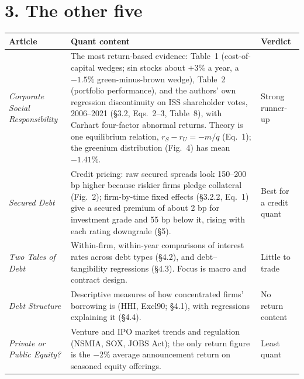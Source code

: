 \documentclass[11pt,a4paper]{article}
\begin{document}
\section*{3. The other five}
\begin{center}\small
\begin{tabularx}{\linewidth}{@{}lYl@{}}
  \toprule
  Article & Quant content & Verdict \\ \midrule
  \emph{Corporate Social Responsibility} &
  The most return-based evidence: Table~1 (cost-of-capital wedges; sin stocks about $+3\%$ a year, a
  $-1.5\%$ green-minus-brown wedge), Table~2 (portfolio performance), and the authors' own regression
  discontinuity on ISS shareholder votes, 2006--2021 (§3.2, Eqs.~2--3, Table~8), with Carhart
  four-factor abnormal returns. Theory is one equilibrium relation, $r_S-r_U=-m/q$ (Eq.~1); the greenium
  distribution (Fig.~4) has mean $-1.41\%$. &
  Strong runner-up \\[3pt]
  \emph{Secured Debt} &
  Credit pricing: raw secured spreads look 150--200 bp higher because riskier firms pledge collateral
  (Fig.~2); firm-by-time fixed effects (§3.2.2, Eq.~1) give a secured premium of about 2 bp for
  investment grade and 55 bp below it, rising with each rating downgrade (§5). &
  Best for a credit quant \\[3pt]
  \emph{Two Tales of Debt} &
  Within-firm, within-year comparisons of interest rates across debt types (§4.2), and debt--tangibility
  regressions (§4.3). Focus is macro and contract design. &
  Little to trade \\[3pt]
  \emph{Debt Structure} &
  Descriptive measures of how concentrated firms' borrowing is (HHI, Excl90; §4.1), with regressions
  explaining it (§4.4). &
  No return content \\[3pt]
  \emph{Private or Public Equity?} &
  Venture and IPO market trends and regulation (NSMIA, SOX, JOBS Act); the only return figure is the
  $-2\%$ average announcement return on seasoned equity offerings. &
  Least quant \\ \bottomrule
\end{tabularx}
\end{center}
\end{document}
